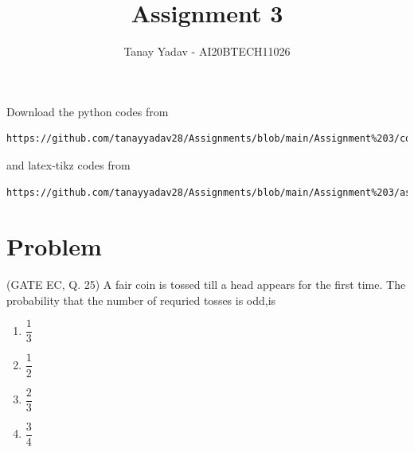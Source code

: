 \documentclass[journal,12pt,twocolumn]{IEEEtran}
\begin{document}
     \def\rightbox#1{\makebox[0in][r]{#1}}
     \def\centbox#1{\makebox[0in]{#1}}
     \def\topbox#1{\raisebox{-\baselineskip}[0in][0in]{#1}}
     \def\midbox#1{\raisebox{-0.5\baselineskip}[0in][0in]{#1}}
\vspace{3cm}
\title{Assignment 3}
\author{Tanay Yadav - AI20BTECH11026}
\maketitle
\newpage
\bigskip
\renewcommand{\thefigure}{\theenumi}
\renewcommand{\thetable}{\theenumi}
Download the python codes from 
\begin{lstlisting}
https://github.com/tanayyadav28/Assignments/blob/main/Assignment%203/code/assignment3.py
\end{lstlisting}
%
and latex-tikz codes from 
%
\begin{lstlisting}
https://github.com/tanayyadav28/Assignments/blob/main/Assignment%203/assignment3.tex
\end{lstlisting}
\section{Problem}
(GATE EC, Q. 25) A fair coin is tossed till a head appears for the first time. The probability that the number of requried tosses is odd,is\\
\begin{enumerate}
    \item $\dfrac{1}{3}$\\
    \item $\dfrac{1}{2}$\\
    \item $\dfrac{2}{3}$\\
    \item $\dfrac{3}{4}$
\end{enumerate}
\end{document}
